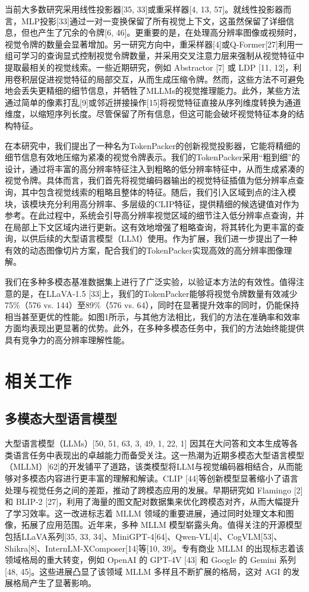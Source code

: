 当前大多数研究采用线性投影器[35, 33]或重采样器[4, 13, 57]。就线性投影器而言，MLP投影[33]通过一对一变换保留了所有视觉上下文，这虽然保留了详细信息，但也产生了冗余的令牌[6, 46]。更重要的是，在处理高分辨率图像或视频时，视觉令牌的数量会显著增加。另一研究方向中，重采样器[4]或Q-Former[27]利用一组可学习的查询显式控制视觉令牌数量，并采用交叉注意力层来强制从视觉特征中提取最相关的视觉线索。一些近期研究，例如 Abstractor [7] 或 LDP [11, 12]，利用卷积层促进视觉特征的局部交互，从而生成压缩令牌。然而，这些方法不可避免地会丢失更精细的细节信息，并牺牲了MLLMs的视觉推理能力。此外，某些方法通过简单的像素打乱[9]或邻近拼接操作[15]将视觉特征直接从序列维度转换为通道维度，以缩短序列长度。尽管保留了所有信息，但这可能会破坏视觉特征本身的结构特征。

在本研究中，我们提出了一种名为TokenPacker的创新视觉投影器，它能将精细的细节信息有效地压缩为紧凑的视觉令牌表示。我们的TokenPacker采用“粗到细”的设计，通过将丰富的高分辨率特征注入到粗略的低分辨率特征中，从而生成紧凑的视觉令牌。具体而言，我们首先将视觉编码器输出的视觉特征插值为低分辨率点查询，其中包含视觉线索的粗略且整体的特征。随后，我们引入区域到点的注入模块，该模块充分利用高分辨率、多层级的CLIP特征，提供精细的候选键值对作为参考。在此过程中，系统会引导高分辨率视觉区域的细节注入低分辨率点查询，并在局部上下文区域内进行更新。这有效地增强了粗略查询，将其转化为更丰富的查询，以供后续的大型语言模型（LLM）使用。作为扩展，我们进一步提出了一种有效的动态图像切片方案，配合我们的TokenPacker实现高效的高分辨率图像理解。

我们在多种多模态基准数据集上进行了广泛实验，以验证本方法的有效性。值得注意的是，在LLaVA-1.5 [33]上，我们的TokenPacker能够将视觉令牌数量有效减少75\%（576 vs. 144）至89\%（576 vs. 64），同时在显著提升效率的同时，仍能保持相当甚至更优的性能。如图1所示，与其他方法相比，我们的方法在准确率和效率方面均表现出更显著的优势。此外，在多种多模态任务中，我们的方法始终能提供具有竞争力的高分辨率理解性能。

\section{相关工作}

\subsection{多模态大型语言模型}

大型语言模型（LLMs）[50, 51, 63, 3, 49, 1, 22, 1] 因其在大问答和文本生成等各类语言任务中表现出的卓越能力而备受关注。这一热潮为近期多模态大型语言模型（MLLM）[62]的开发铺平了道路，该类模型将LLM与视觉编码器相结合，从而能够对多模态内容进行更丰富的理解和解读。CLIP [44]等创新模型显著缩小了语言处理与视觉任务之间的差距，推动了跨模态应用的发展。早期研究如 Flamingo [2] 和 BLIP-2 [27]，利用了海量的图文配对数据集来优化跨模态对齐，从而大幅提升了学习效率。这一改进标志着 MLLM 领域的重要进展，通过同时处理文本和图像，拓展了应用范围。近年来，多种 MLLM 模型崭露头角。值得关注的开源模型包括LLaVA系列[35, 33, 34]、MiniGPT-4[64]、Qwen-VL[4]、CogVLM[53]、Shikra[8]、InternLM-XComposer[14]等[10, 39]。专有商业 MLLM 的出现标志着该领域格局的重大转变，例如 OpenAI 的 GPT-4V [43] 和 Google 的 Gemini 系列 [48, 45]。这些进展凸显了该领域 MLLM 多样且不断扩展的格局，这对 AGI 的发展格局产生了显著影响。

